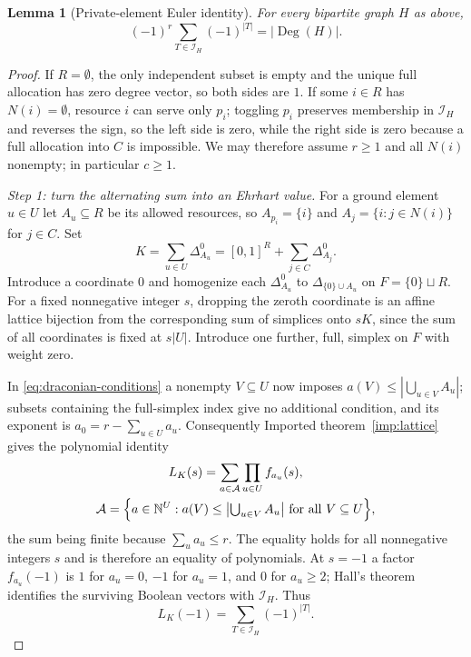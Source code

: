 \documentclass[11pt]{article}
\numberwithin{equation}{section}
\newtheorem{lemma}[theorem]{Lemma}
\theoremstyle{definition}
\theoremstyle{remark}
\newcommand{\N}{\mathbb N}
\newcommand{\Deg}{\operatorname{Deg}}
\newcommand{\Ical}{\mathcal I}
\newcommand{\Dz}[1]{\Delta^{0}_{#1}}
\begin{document}
\begin{lemma}[Private-element Euler identity]
\label{lem:euler}
For every bipartite graph $H$ as above,
\begin{equation}
 (-1)^r\sum_{T\in\Ical_H}(-1)^{|T|}=|\Deg(H)|.
 \label{eq:euler}
\end{equation}
\end{lemma}

\begin{proof}
If $R=\emptyset$, the only independent subset is empty and the unique full
allocation has zero degree vector, so both sides are $1$. If some $i\in R$ has
$N(i)=\emptyset$, resource $i$ can serve only $p_i$; toggling $p_i$ preserves
membership in $\Ical_H$ and reverses the sign, so the left side is zero, while
the right side is zero because a full allocation into $C$ is impossible. We
may therefore assume $r\ge1$ and all $N(i)$ nonempty; in particular $c\ge1$.

\smallskip\noindent\emph{Step 1: turn the alternating sum into an Ehrhart
value.} For a ground element $u\in U$ let $A_u\subseteq R$ be its allowed
resources, so $A_{p_i}=\{i\}$ and $A_j=\{i:j\in N(i)\}$ for $j\in C$. Set
\begin{equation}
 K=\sum_{u\in U}\Dz{A_u}=[0,1]^R+\sum_{j\in C}\Dz{A_j}.
 \label{eq:K}
\end{equation}
Introduce a coordinate $0$ and homogenize each $\Dz{A_u}$ to
$\Delta_{\{0\}\cup A_u}$ on $F=\{0\}\sqcup R$. For a fixed nonnegative integer
$s$, dropping the zeroth coordinate is an affine lattice bijection from the
corresponding sum of simplices onto $sK$, since the sum of all coordinates is
fixed at $s|U|$. Introduce one further, full, simplex on $F$ with weight zero.

In \eqref{eq:draconian-conditions} a nonempty $V\subseteq U$ now imposes
$a(V)\le|\bigcup_{u\in V}A_u|$; subsets containing the full-simplex index give
no additional condition, and its exponent is $a_0=r-\sum_{u\in U}a_u$.
Consequently Imported theorem~\ref{imp:lattice} gives the polynomial identity
\begin{equation}
 \begin{gathered}
 L_K(s)=\sum_{a\in\mathcal A}\prod_{u\in U}f_{a_u}(s),\\
 \mathcal A=\Bigl\{a\in\N^U:a(V)\le\bigl|\textstyle\bigcup_{u\in V}A_u\bigr|
                           \text{ for all }V\subseteq U\Bigr\},
 \end{gathered}
 \label{eq:K-ehrhart}
\end{equation}
the sum being finite because $\sum_ua_u\le r$. The equality holds for all
nonnegative integers $s$ and is therefore an equality of polynomials. At
$s=-1$ a factor $f_{a_u}(-1)$ is $1$ for $a_u=0$, $-1$ for $a_u=1$, and $0$
for $a_u\ge2$; Hall's theorem identifies the surviving Boolean vectors with
$\Ical_H$. Thus
\begin{equation}
 L_K(-1)=\sum_{T\in\Ical_H}(-1)^{|T|}.
 \label{eq:alt-ehrhart}
\end{equation}


\end{proof}
\end{document}
